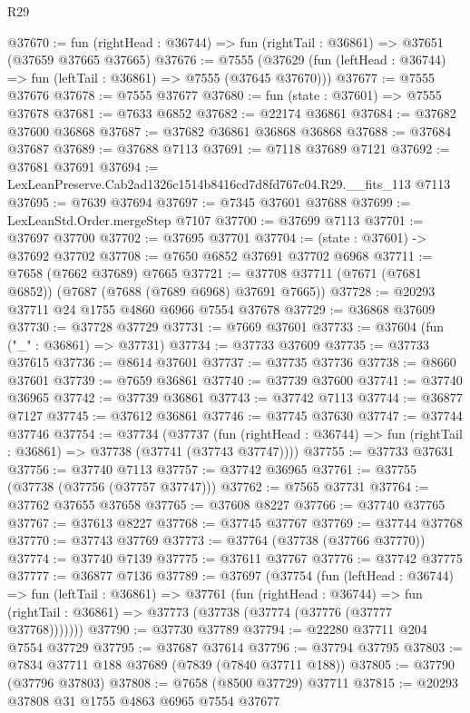 \begin{lexlean}{R29}
\begin{coremodule}
@37670 := fun (rightHead : @36744) => fun (rightTail : @36861) => @37651 (@37659 @37665 @37665)
@37676 := @7555
    (@37629 (fun (leftHead : @36744) => fun (leftTail : @36861) => @7555 (@37645 @37670)))
@37677 := @7555 @37676
@37678 := @7555 @37677
@37680 := fun (state : @37601) => @7555 @37678
@37681 := @7633 @6852
@37682 := @22174 @36861
@37684 := @37682 @37600 @36868
@37687 := @37682 @36861 @36868 @36868
@37688 := @37684 @37687
@37689 := @37688 @7113
@37691 := @7118 @37689 @7121
@37692 := @37681 @37691
@37694 := LexLeanPreserve.Cab2ad1326c1514b8416cd7d8fd767c04.R29.__fits_113 @7113
@37695 := @7639 @37694
@37697 := @7345 @37601 @37688
@37699 := LexLeanStd.Order.mergeStep @7107
@37700 := @37699 @7113
@37701 := @37697 @37700
@37702 := @37695 @37701
@37704 := (state : @37601) -> @37692 @37702
@37708 := @7650 @6852 @37691 @37702 @6968
@37711 := @7658 (@7662 @37689) @7665
@37721 := @37708 @37711 (@7671 (@7681 @6852)) (@7687 (@7688 (@7689 @6968) @37691 @7665))
@37728 := @20293 @37711 @24 @1755 @4860 @6966 @7554 @37678
@37729 := @36868 @37609
@37730 := @37728 @37729
@37731 := @7669 @37601
@37733 := @37604 (fun ("_" : @36861) => @37731)
@37734 := @37733 @37609
@37735 := @37733 @37615
@37736 := @8614 @37601
@37737 := @37735 @37736
@37738 := @8660 @37601
@37739 := @7659 @36861
@37740 := @37739 @37600
@37741 := @37740 @36965
@37742 := @37739 @36861
@37743 := @37742 @7113
@37744 := @36877 @7127
@37745 := @37612 @36861
@37746 := @37745 @37630
@37747 := @37744 @37746
@37754 := @37734
    (@37737
      (fun (rightHead : @36744) => fun (rightTail : @36861) => @37738 (@37741 (@37743 @37747))))
@37755 := @37733 @37631
@37756 := @37740 @7113
@37757 := @37742 @36965
@37761 := @37755 (@37738 (@37756 (@37757 @37747)))
@37762 := @7565 @37731
@37764 := @37762 @37655 @37658
@37765 := @37608 @8227
@37766 := @37740 @37765
@37767 := @37613 @8227
@37768 := @37745 @37767
@37769 := @37744 @37768
@37770 := @37743 @37769
@37773 := @37764 (@37738 (@37766 @37770))
@37774 := @37740 @7139
@37775 := @37611 @37767
@37776 := @37742 @37775
@37777 := @36877 @7136
@37789 := @37697
    (@37754
      (fun (leftHead : @36744) =>
      fun (leftTail : @36861) =>
      @37761
        (fun (rightHead : @36744) =>
        fun (rightTail : @36861) => @37773 (@37738 (@37774 (@37776 (@37777 @37768)))))))
@37790 := @37730 @37789
@37794 := @22280 @37711 @204 @7554 @37729
@37795 := @37687 @37614
@37796 := @37794 @37795
@37803 := @7834 @37711 @188 @37689 (@7839 (@7840 @37711 @188))
@37805 := @37790 (@37796 @37803)
@37808 := @7658 (@8500 @37729) @37711
@37815 := @20293 @37808 @31 @1755 @4863 @6965 @7554 @37677

\end{coremodule}
\end{lexlean}

